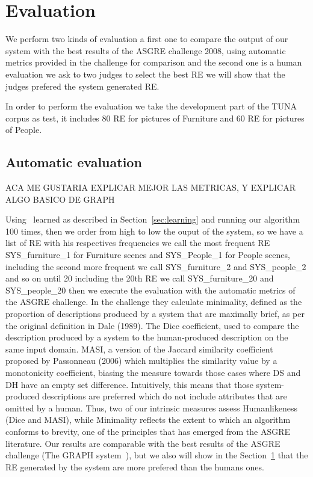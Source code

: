 \section{Evaluation} \label{sec:evaluation}

We perform two kinds of evaluation a first one to compare the output of our system with the best results of the ASGRE challenge 2008, using automatic metrics provided in the challenge for comparison and the second one is a human evaluation we ask to two judges to select the best RE we will show that the judges prefered the system generated RE.

In order to perform the evaluation we take the development part of the TUNA corpus as test, it includes 80 RE for pictures of Furniture  and 60 RE for pictures of People.

\subsection{Automatic evaluation} \label{sec:automaticevaluation}

ACA ME GUSTARIA EXPLICAR MEJOR LAS METRICAS, Y EXPLICAR ALGO BASICO DE GRAPH

Using \puse~learned as described in Section~\ref{sec:learning} and running our algorithm 100 times, then we order from high to low the ouput of the system, so we have a list of RE with his respectives frequencies we call the most frequent RE SYS\_furniture\_1 for Furniture scenes and SYS\_People\_1 for People scenes, including the second more frequent we call SYS\_furniture\_2 and SYS\_people\_2 and so on until 20 including the 20th RE we call SYS\_furniture\_20 and SYS\_people\_20 then we execute the evaluation with the automatic metrics of the ASGRE challenge. 
In the challenge they calculate minimality, defined as the proportion of descriptions produced by a system
that are maximally brief, as per the original definition in Dale (1989). The Dice coefficient, used to compare the description produced by a system to the human-produced description on the same input domain. %
MASI, a version of the Jaccard similarity coefficient proposed
by Passonneau (2006) which multiplies the similarity value by a monotonicity coefficient, biasing
the measure towards those cases where DS and
DH have an empty set difference. Intuitively, this
means that those system-produced descriptions are
preferred which do not include attributes that are
omitted by a human. Thus, two of our intrinsic measures assess Humanlikeness (Dice and MASI), while
Minimality reflects the extent to which an algorithm
conforms to brevity, one of the principles that has
emerged from the ASGRE literature.
Our results are comparable with the best results of the ASGRE challenge (The GRAPH system~\cite{KrahmerGRAPH}), but we also will show in the Section~\ref{sec:evaluation} that the RE generated by the system are more prefered than the humans ones.

